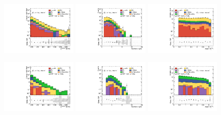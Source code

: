 \begin{figure}[!ht]
  \begin{center}

    \includegraphics[width=0.32\textwidth]{images/results/fr2_unblind/can_CRW_ph_pt0_afterFit.pdf}
    \includegraphics[width=0.32\textwidth]{images/results/fr2_unblind/can_CRW_jet_n_afterFit.pdf}
    \includegraphics[width=0.32\textwidth]{images/results/fr2_unblind/can_CRW_dphi_jetmet_afterFit.pdf}

    \includegraphics[width=0.32\textwidth]{images/results/fr2_unblind/can_CRT_ph_pt0_afterFit.pdf}
    \includegraphics[width=0.32\textwidth]{images/results/fr2_unblind/can_CRT_jet_n_afterFit.pdf}
    \includegraphics[width=0.32\textwidth]{images/results/fr2_unblind/can_CRT_dphi_jetmet_afterFit.pdf}


\end{center}
\end{figure}
